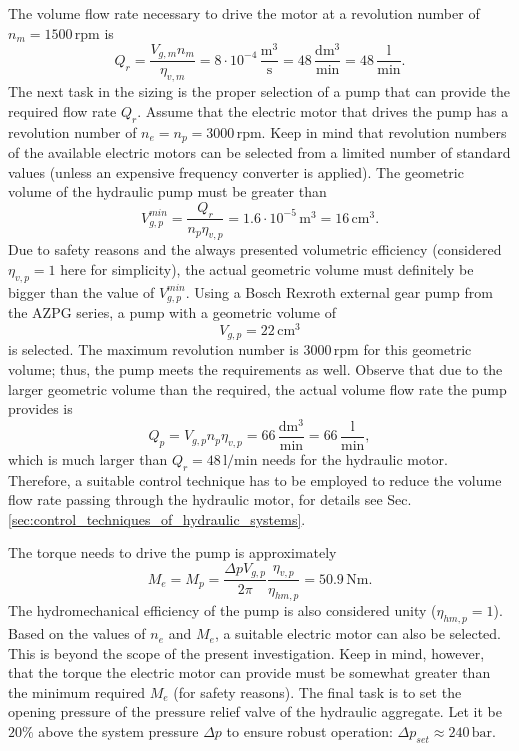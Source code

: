 The volume flow rate necessary to drive the motor at a revolution number of $n_m=1500\,\mathrm{rpm}$ is
%
\begin{equation}
Q_r = \frac{V_{g,m} n_m}{\eta_{v,m}} = 8 \cdot 10^{-4}\,\mathrm{\frac{m^3}{s}} = 48\,\mathrm{\frac{dm^3}{min}} = 48\,\mathrm{\frac{l}{min}}.
\end{equation}
%
The next task in the sizing is the proper selection of a pump that can provide the required flow rate $Q_r$. Assume that the electric motor that drives the pump has a revolution number of $n_e=n_p=3000\,\mathrm{rpm}$. Keep in mind that revolution numbers of the available electric motors can be selected from a limited number of standard values (unless an expensive frequency converter is applied). The geometric volume of the hydraulic pump must be greater than
%
\begin{equation}
V_{g,p}^{min} = \frac{Q_r}{n_p \eta_{v,p}} = 1.6 \cdot 10^{-5}\,\mathrm{m^3} = 16\,\mathrm{cm^3}.
\end{equation}
%
Due to safety reasons and the always presented volumetric efficiency (considered $\eta_{v,p}=1$ here for simplicity), the actual geometric volume must definitely be bigger than the value of $V_{g,p}^{min}$. Using a Bosch Rexroth external gear pump from the AZPG series, a pump with a geometric volume of
%
\begin{equation}
V_{g,p} = 22\,\mathrm{cm^3}
\end{equation}
%
is selected. The maximum revolution number is $3000\,\mathrm{rpm}$ for this geometric volume; thus, the pump meets the requirements as well. Observe that due to the larger geometric volume than the required, the actual volume flow rate the pump provides is
%
\begin{equation}
Q_p = V_{g,p} n_p \eta_{v,p} = 66\,\mathrm{\frac{dm^3}{min}} = 66\,\mathrm{\frac{l}{min}},
\end{equation}
%
which is much larger than $Q_r=48\,\mathrm{l/min}$ needs for the hydraulic motor. Therefore, a suitable control technique has to be employed to reduce the volume flow rate passing through the hydraulic motor, for details see Sec.\,\ref{sec:control_techniques_of_hydraulic_systems}.

The torque needs to drive the pump is approximately
%
\begin{equation}
M_e = M_p = \frac{\Delta p V_{g,p}}{2 \pi} \frac{\eta_{v,p}}{\eta_{hm,p}} = 50.9\,\mathrm{Nm}.
\end{equation}
%
The hydromechanical efficiency of the pump is also considered unity ($\eta_{hm,p}=1$). Based on the values of $n_e$ and $M_e$, a suitable electric motor can also be selected. This is beyond the scope of the present investigation. Keep in mind, however, that the torque the electric motor can provide must be somewhat greater than the minimum required $M_e$ (for safety reasons). The final task is to set the opening pressure of the pressure relief valve of the hydraulic aggregate. Let it be $20\%$ above the system pressure $\Delta p$ to ensure robust operation: $\Delta p_{set} \approx 240\,\mathrm{bar}$.

